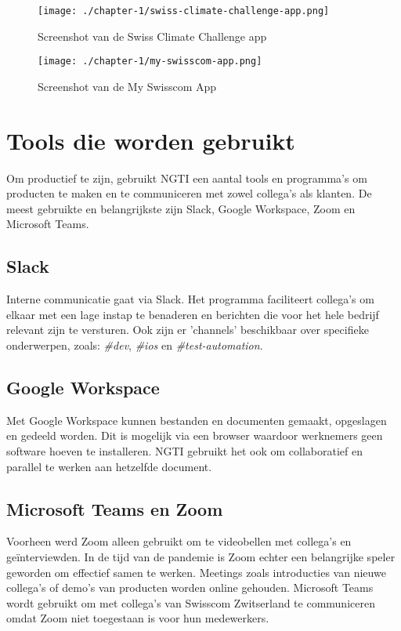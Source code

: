 \begin{figure}[hbt!]
  \centering
  \begin{minipage}{0.45\textwidth}
      \centering
      \texttt{[image: ./chapter-1/swiss-climate-challenge-app.png]}
      \caption{Screenshot van de Swiss Climate Challenge app \cite{ngti-swisscom-climate-challenge}}
      \label{fig:swiss-climate-challenge-app}
  \end{minipage}\hfill
  \begin{minipage}{0.45\textwidth}
      \centering
      \texttt{[image: ./chapter-1/my-swisscom-app.png]}
      \caption{Screenshot van de My Swisscom App \cite{ngti-my-swisscom-app}}
      \label{fig:my-swisscom-app}
  \end{minipage}
\end{figure}


\section{Tools die worden gebruikt}\label{sec:ch1-tools-die-gebruikt-worden}
Om productief te zijn, gebruikt NGTI een aantal tools en programma's om producten te maken en te communiceren met zowel collega's als klanten. De meest gebruikte en belangrijkste zijn Slack, Google Workspace, Zoom en Microsoft Teams.

\subsection{Slack}\label{subsec:slack}
Interne communicatie gaat via Slack. Het programma faciliteert collega's om elkaar met een lage instap te benaderen en berichten die voor het hele bedrijf relevant zijn te versturen. Ook zijn er 'channels' beschikbaar over specifieke onderwerpen, zoals: \textit{\#dev}, \textit{\#ios} en \textit{\#test-automation}.

\subsection{Google Workspace}\label{subsec:google-workspace}
Met Google Workspace kunnen bestanden en documenten gemaakt, opgeslagen en gedeeld worden. Dit is mogelijk via een browser waardoor werknemers geen software hoeven te installeren. NGTI gebruikt het ook om collaboratief en parallel te werken aan hetzelfde document.

\subsection{Microsoft Teams en Zoom}\label{subsec:microsoft-teams-en-zoom}
Voorheen werd Zoom alleen gebruikt om te videobellen met collega's en geïnterviewden. In de tijd van de pandemie is Zoom echter een belangrijke speler geworden om effectief samen te werken. Meetings zoals introducties van nieuwe collega's of demo's van producten worden online gehouden. Microsoft Teams wordt gebruikt om met collega's van Swisscom Zwitserland te communiceren omdat Zoom niet toegestaan is voor hun medewerkers.

